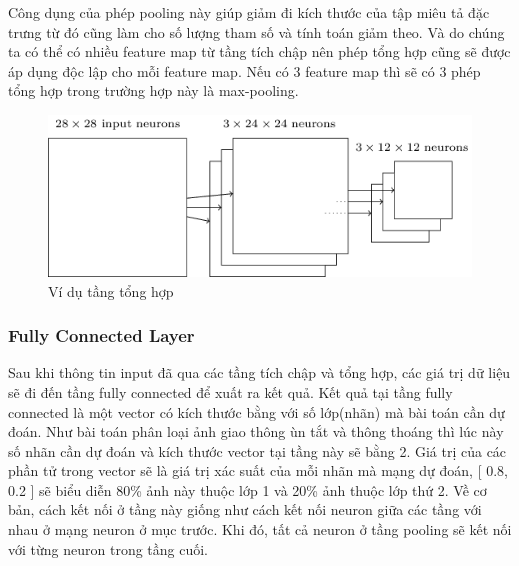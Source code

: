 		Công dụng của phép pooling này giúp giảm đi kích thước của tập miêu tả đặc trưng từ đó cũng làm cho số lượng tham số và tính toán giảm theo. Và do chúng ta có thể có nhiều feature map từ tầng tích chập nên phép tổng hợp cũng sẽ được áp dụng độc lập cho mỗi feature map. Nếu có 3 feature map thì sẽ có 3 phép tổng hợp trong trường hợp này là max-pooling.
		
		\begin{figure}[h!]
			\centering
			\includegraphics[scale=0.5]{charts/pooling_ex.png}
			\caption{Ví dụ tầng tổng hợp \cite{conv-layer}}
			\label{fig:pooling_ex}
		\end{figure}
		
	
	\subsubsection{Fully Connected Layer}
		Sau khi thông tin input đã qua các tầng tích chập và tổng hợp, các giá trị dữ liệu sẽ đi đến tầng fully connected để xuất ra kết quả. Kết quả tại tầng fully connected là một vector có kích thước bằng với số lớp(nhãn) mà bài toán cần dự đoán. Như bài toán phân loại ảnh giao thông ùn tắt và thông thoáng thì lúc này số nhãn cần dự đoán và kích thước vector tại tầng này sẽ bằng 2. Giá trị của các phần tử trong vector sẽ là giá trị xác suất của mỗi nhãn mà mạng dự đoán, [ 0.8, 0.2 ] sẽ biểu diễn 80\% ảnh này thuộc lớp 1 và 20\% ảnh thuộc lớp thứ 2. Về cơ bản, cách kết nối ở tầng này giống như cách kết nối neuron giữa các tầng với nhau ở mạng neuron ở mục trước. Khi đó, tất cả neuron ở tầng pooling sẽ kết nối với từng neuron trong tầng cuối.


		
	
	
	
	
	
